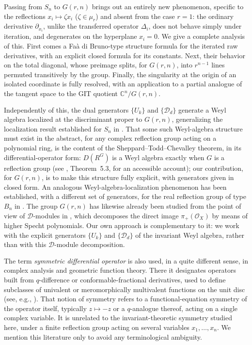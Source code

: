 \documentclass[11pt]{article}
\theoremstyle{remark}
\newcommand{\CC}{\mathbb{C}}
\begin{document}
Passing from $S_n$ to $G(r,n)$ brings out an entirely new phenomenon, specific to the reflections $x_i\mapsto\zeta x_i$ ($\zeta\in\mu_r$) and absent from the case $r=1$: the ordinary derivative $\partial_{x_i}$, unlike the transferred operator $\Delta_i$, does not behave simply under iteration, and degenerates on the hyperplane $x_i=0$. We give a complete analysis of this. First comes a Faà di Bruno-type structure formula for the iterated raw derivatives, with an explicit closed formula for its constants. Next, their behavior on the total diagonal, whose preimage splits, for $G(r,n)$, into $r^{n-1}$ lines permuted transitively by the group. Finally, the singularity at the origin of an isolated coordinate is fully resolved, with an application to a partial analogue of the tangent space to the GIT quotient $\CC^n/G(r,n)$.

Independently of this, the dual generators $\{U_k\}$ and $\{\mathcal D_d\}$ generate a Weyl algebra localized at the discriminant proper to $G(r,n)$, generalizing the localization result established for $S_n$ in \cite{N}. That some such Weyl-algebra structure must exist in the abstract, for any complex reflection group acting on a polynomial ring, is the content of the Sheppard--Todd--Chevalley theorem, in its differential-operator form: $D(R^G)$ is a Weyl algebra exactly when $G$ is a reflection group (see \cite{Tr}, Theorem~5.3, for an accessible account); our contribution, for $G(r,n)$, is to make this structure fully explicit, with generators given in closed form. An analogous Weyl-algebra-localization phenomenon has been established, with a different set of generators, for the real reflection group of type $B_n$ in \cite{NB}. The group $G(r,n)$ has likewise already been studied from the point of view of $\mathcal D$-modules in \cite{NL}, which decomposes the direct image $\pi_+(\mathcal O_X)$ by means of higher Specht polynomials. Our own approach is complementary to it: we work with the explicit generators $\{U_k\}$ and $\{\mathcal D_d\}$ of the invariant Weyl algebra, rather than with this $\mathcal D$-module decomposition.

The term \emph{symmetric differential operator} is also used, in a quite different sense, in complex analysis and geometric function theory. There it designates operators built from $q$-difference or conformable-fractional derivatives, used to define subclasses of univalent or meromorphically multivalent functions on the unit disc (see, e.g., \cite{IDarus,IAldawish,IEO}). That notion of symmetry refers to a functional-equation symmetry of the operator itself, typically $z\mapsto -z$ or a $q$-analogue thereof, acting on a single complex variable. It is unrelated to the invariant-theoretic symmetry studied here, under a finite reflection group acting on several variables $x_1,\dots,x_n$. We mention this literature only to avoid any terminological ambiguity.
\end{document}
